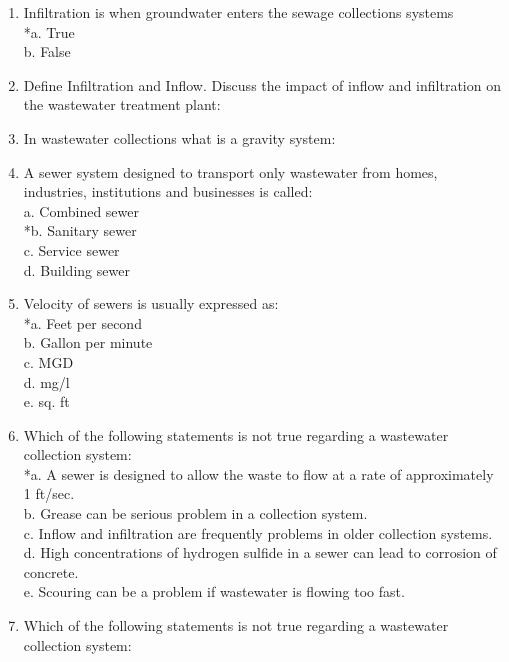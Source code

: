 \begin{enumerate}
\item  Infiltration is when groundwater enters the sewage collections systems \\

*a. True \\
b. False \\

\item Define Infiltration and Inflow.  Discuss the impact of inflow and infiltration on the wastewater treatment plant:


\item  In wastewater collections what is a gravity system:

\item  A sewer system designed to transport only wastewater from homes, industries, institutions and businesses is called: \\

a. Combined sewer \\
*b. Sanitary sewer \\
c. Service sewer \\
d. Building sewer \\

\item  Velocity of sewers is usually expressed as: \\

*a. Feet per second \\
b. Gallon per minute \\
c. MGD \\
d. mg/l \\
e. sq. ft \\

\item  Which of the following statements is not true regarding a wastewater collection system: \\

*a. A sewer is designed to allow the waste to flow at a rate of approximately 1 ft/sec. \\
b. Grease can be serious problem in a collection system. \\
c. Inflow and infiltration are frequently problems in older collection systems. \\
d. High concentrations of hydrogen sulfide in a sewer can lead to corrosion of concrete. \\
e. Scouring can be a problem if wastewater is flowing too fast. \\

\item  Which of the following statements is not true regarding a wastewater collection system: \\


\end{enumerate}
